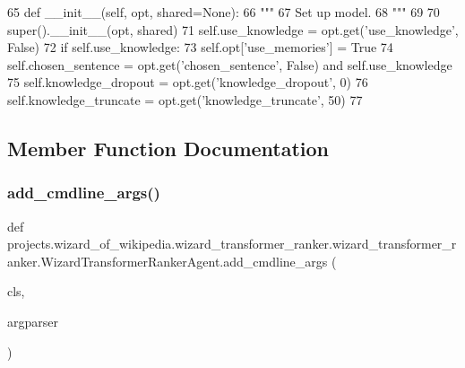 \begin{DoxyCode}
65     \textcolor{keyword}{def }\_\_init\_\_(self, opt, shared=None):
66         \textcolor{stringliteral}{"""}
67 \textcolor{stringliteral}{        Set up model.}
68 \textcolor{stringliteral}{        """}
69 
70         super().\_\_init\_\_(opt, shared)
71         self.use\_knowledge = opt.get(\textcolor{stringliteral}{'use\_knowledge'}, \textcolor{keyword}{False})
72         \textcolor{keywordflow}{if} self.use\_knowledge:
73             self.opt[\textcolor{stringliteral}{'use\_memories'}] = \textcolor{keyword}{True}
74         self.chosen\_sentence = opt.get(\textcolor{stringliteral}{'chosen\_sentence'}, \textcolor{keyword}{False}) \textcolor{keywordflow}{and} self.use\_knowledge
75         self.knowledge\_dropout = opt.get(\textcolor{stringliteral}{'knowledge\_dropout'}, 0)
76         self.knowledge\_truncate = opt.get(\textcolor{stringliteral}{'knowledge\_truncate'}, 50)
77 
\end{DoxyCode}


\subsection{Member Function Documentation}
\mbox{\label{classprojects_1_1wizard__of__wikipedia_1_1wizard__transformer__ranker_1_1wizard__transformer__rad02f16524e5e0423aa3e2c69e1330ee1_a8dea037d2903975503586b5aa5c8bd36}} 
\subsubsection{\texorpdfstring{add\+\_\+cmdline\+\_\+args()}{add\_cmdline\_args()}}
{\footnotesize\ttfamily def projects.\+wizard\+\_\+of\+\_\+wikipedia.\+wizard\+\_\+transformer\+\_\+ranker.\+wizard\+\_\+transformer\+\_\+ranker.\+Wizard\+Transformer\+Ranker\+Agent.\+add\+\_\+cmdline\+\_\+args (\begin{DoxyParamCaption}\item[{}]{cls,  }\item[{}]{argparser }\end{DoxyParamCaption})}


